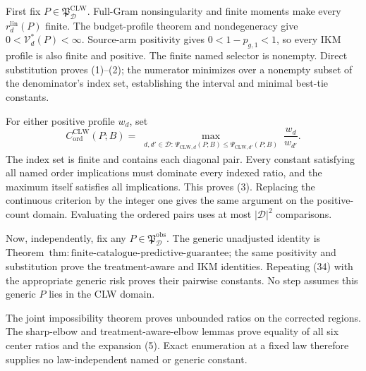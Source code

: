 First fix \(P\in\mathfrak P_{\mathcal D}^{\mathrm{CLW}}\). Full-Gram nonsingularity and finite moments make every \(r_d^{\mathrm{lin}}(P)\) finite. The budget-profile theorem and nondegeneracy give \(0<\mathcal V_d^*(P)<\infty\). Source-arm positivity gives \(0<1-p_{g,1}<1\), so every IKM profile is also finite and positive. The finite named selector is nonempty. Direct substitution proves (1)--(2); the numerator minimizes over a nonempty subset of the denominator's index set, establishing the interval and minimal best-tie constants.

For either positive profile \(w_d\), set
\[
 C_{\mathrm{ord}}^{\mathrm{CLW}}(P;B)
 =\max_{\substack{d,d'\in\mathcal D:\,
 \Psi_{\mathrm{CLW},d}(P;B)
 \le\Psi_{\mathrm{CLW},d'}(P;B)}}\frac{w_d}{w_{d'}}.       \tag{34}
\]
The index set is finite and contains each diagonal pair. Every constant satisfying all named order implications must dominate every indexed ratio, and the maximum itself satisfies all implications. This proves (3). Replacing the continuous criterion by the integer one gives the same argument on the positive-count domain. Evaluating the ordered pairs uses at most \(|\mathcal D|^2\) comparisons.

Now, independently, fix any \(P\in\mathfrak P_{\mathcal D}^{\mathrm{obs}}\). The generic unadjusted identity is Theorem~\(\mathrm{thm{:}finite\text{-}catalogue\text{-}predictive\text{-}guarantee}\); the same positivity and substitution prove the treatment-aware and IKM identities. Repeating (34) with the appropriate generic risk proves their pairwise constants. No step assumes this generic \(P\) lies in the CLW domain.

The joint impossibility theorem proves unbounded ratios on the corrected regions. The sharp-elbow and treatment-aware-elbow lemmas prove equality of all six center ratios and the expansion (5). Exact enumeration at a fixed law therefore supplies no law-independent named or generic constant.